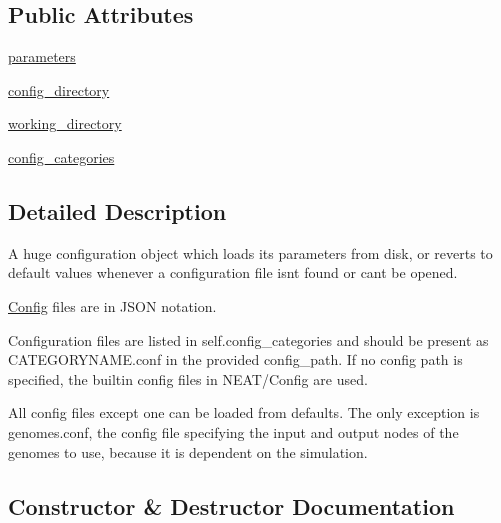 \subsection*{Public Attributes}
\begin{DoxyCompactItemize}
\item 
\hyperlink{classNEAT__PyGenetics_1_1NEAT_1_1Config_1_1NEATConfig_1_1NEATConfig_a04ae4f640ee3d8a9dadbbe0a293bb3d6}{parameters}
\item 
\hyperlink{classNEAT__PyGenetics_1_1NEAT_1_1Config_1_1NEATConfig_1_1NEATConfig_ae3bd7eb4a5b4ad753d5c2de3c70aed06}{config\+\_\+directory}
\item 
\hyperlink{classNEAT__PyGenetics_1_1NEAT_1_1Config_1_1NEATConfig_1_1NEATConfig_ac88a0f28d412192f52a5cb55935beaa4}{working\+\_\+directory}
\item 
\hyperlink{classNEAT__PyGenetics_1_1NEAT_1_1Config_1_1NEATConfig_1_1NEATConfig_a1e2b0edc6558d673c7f7a197d2faa72e}{config\+\_\+categories}
\end{DoxyCompactItemize}


\subsection{Detailed Description}
A huge configuration object which loads it\textquotesingle{}s parameters from disk, or reverts to default values whenever a configuration file isn\textquotesingle{}t found or can\textquotesingle{}t be opened. 

\hyperlink{namespaceNEAT__PyGenetics_1_1NEAT_1_1Config}{Config} files are in J\+S\+ON notation.

Configuration files are listed in self.\+config\+\_\+categories and should be present as C\+A\+T\+E\+G\+O\+R\+Y\+N\+A\+M\+E.\+conf in the provided config\+\_\+path. If no config path is specified, the builtin config files in N\+E\+A\+T/\+Config are used.

All config files except one can be loaded from defaults. The only exception is genomes.\+conf, the config file specifying the input and output nodes of the genomes to use, because it is dependent on the simulation. 

\subsection{Constructor \& Destructor Documentation}
